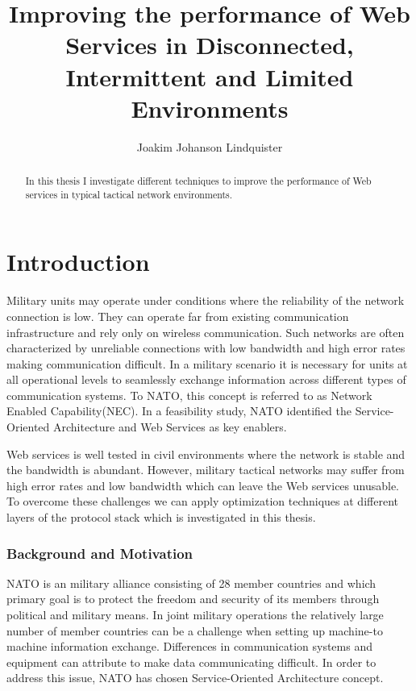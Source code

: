\documentclass[USenglish]{article}
\title{Improving the performance of Web Services in Disconnected, Intermittent and Limited Environments}
\author{Joakim Johanson Lindquister}
\begin{document}
\ififorside{}

\begin{abstract}
In this thesis I investigate different techniques to improve the performance of Web services in typical tactical network environments.
\end{abstract}
\pagebreak

\tableofcontents 
\listoftables
\listoffigures

\pagebreak


\part{Introduction}
Military units may operate under conditions where the reliability of the network connection is low. They can operate far from existing communication infrastructure and rely only on wireless communication. Such networks are often characterized by unreliable connections with low bandwidth and high error rates making communication difficult. In a military scenario it is necessary for units at all operational levels to seamlessly exchange information across different types of communication systems. To NATO, this concept is referred to as Network Enabled Capability(NEC). In a feasibility study, NATO identified the Service-Oriented Architecture and Web Services as key enablers\cite{nnec-study}.

Web services is well tested in civil environments where the network is stable and the bandwidth is abundant. However, military tactical networks may suffer from high error rates and low bandwidth which can leave the Web services unusable. To overcome these challenges we can apply optimization techniques at different layers of the protocol stack which is investigated in this thesis.


\section{Background and Motivation}
NATO is an military alliance consisting of 28 member countries\cite{nato-homepage-member-countries} and which primary goal is to protect the freedom and security of its members through political and military means. In joint military operations the relatively large number of member countries can be a challenge when setting up machine-to machine information exchange. Differences in communication systems and equipment can attribute to make data communicating difficult. In order to address this issue, NATO has chosen Service-Oriented Architecture concept.
\end{document}
